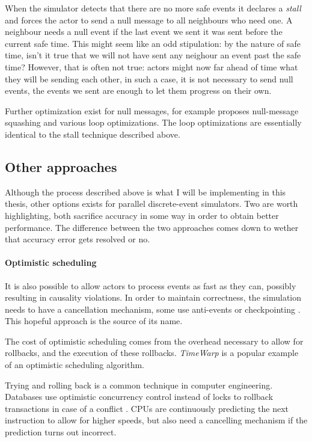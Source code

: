 When the simulator detects that there are no more safe events it declares a \emph{stall} and forces the actor to send a null message to all neighbours who need one.
A neighbour needs a null event if the last event we sent it was sent before the current safe time.
This might seem like an odd stipulation: by the nature of safe time, isn't it true that we will not have sent any neighour an event past the safe time?
However, that is often not true: actors might now far ahead of time what they will be sending each other, in such a case, it is not necessary to send null events, the events we sent are enough to let them progress on their own.

Further optimization exist for null messages, for example \cite{} proposes null-message squashing and various loop optimizations.
The loop optimizations are essentially identical to the stall technique described above. %

\subsection{Other approaches}

Although the process described above is what I will be implementing in this thesis, other options exists for parallel discrete-event simulators.
Two are worth highlighting, both sacrifice accuracy in some way in order to obtain better performance.
The difference between the two approaches comes down to wether that accuracy error gets resolved or no.

\paragraph{Optimistic scheduling} \label{optimistic-scheduling}
It is also possible to allow actors to process events as fast as they can, possibly resulting in causality violations.
In order to maintain correctness, the simulation needs to have a cancellation mechanism, some use anti-events \cite{} or checkpointing \cite{}. %
This hopeful approach is the source of its name.

The cost of optimistic scheduling comes from the overhead necessary to allow for rollbacks, and the execution of these rollbacks.
\emph{TimeWarp} \cite{} is a popular example of an optimistic scheduling algorithm.

Trying and rolling back is a common technique in computer engineering.
Databases use optimistic concurrency control instead of locks to rollback transactions in case of a conflict \cite{dragojevic_no_2015}.
CPUs are continuously predicting the next instruction to allow for higher speeds, but also need a cancelling mechanism if the prediction turns out incorrect.

